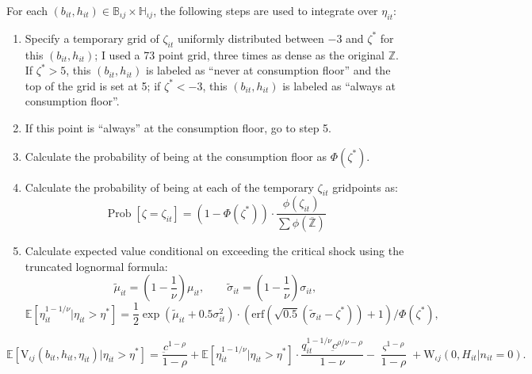 \documentclass[12pt,pdftex,letterpaper]{article}
\newcommand{\Prob}{\operatorname{Prob}}
\newcommand{\erf}{\text{erf}}
\newcommand{\E}{\mathbb{E}}
\newcommand{\Type}{\iota}
\newcommand{\Health}{h}
\newcommand{\PostHealth}{H}
\newcommand{\Value}{\text{V}}
\newcommand{\PostValue}{\text{W}}
\newcommand{\Con}{c}
\newcommand{\Invst}{n}
\newcommand{\Bank}{b}
\newcommand{\Copay}{q}
\newcommand{\ConFloor}{\underbar{\Con}}
\newcommand{\LifeUtility}{\varsigma}
\newcommand{\CRRAcon}{\rho}
\newcommand{\CRRAcare}{\nu}
\newcommand{\Age}{j}
\newcommand{\MedShk}{\eta}
\begin{document}
For each $(\Bank_{it},\Health_{it}) \in \mathbb{B}_{\Type \Age} \times \mathbb{H}_{\Type \Age}$, the following steps are used to integrate over $\MedShk_{it}$:
\begin{enumerate}
\item Specify a temporary grid of $\zeta_{it}$ uniformly distributed between $-3$ and $\zeta^*$ for this $(\Bank_{it},\Health_{it})$; I used a 73 point grid, three times as dense as the original $\mathbb{Z}$.  If $\zeta^* > 5$, this $(\Bank_{it},\Health_{it})$ is labeled as ``never at consumption floor'' and the top of the grid is set at 5; if $\zeta^* < -3$, this $(\Bank_{it},\Health_{it})$ is labeled as ``always at consumption floor''.

\item If this point is ``always'' at the consumption floor, go to step 5.

\item Calculate the probability of being at the consumption floor as $\Phi(\zeta^*)$.

\item Calculate the probability of being at each of the temporary $\zeta_{it}$ gridpoints as:
\begin{equation}
\Prob[\zeta = \zeta_{it}] = (1 - \Phi(\zeta^*)) \cdot \frac{\phi(\zeta_{it})} {\sum \phi(\overline{\mathbb{Z}})}
\end{equation}

\item Calculate expected value conditional on exceeding the critical shock using the truncated lognormal formula:
\begin{equation*}
\tilde{\mu}_{it}  = \left(1 - \frac{1}{\CRRAcare}\right) \mu_{it}, \qquad \tilde{\sigma}_{it} = \left(1 - \frac{1}{\CRRAcare}\right) \sigma_{it},
\end{equation*}
\begin{equation}
\E [\MedShk_{it}^{1-1/\CRRAcare} | \MedShk_{it} > \MedShk^*] = \frac{1}{2} \exp(\tilde{\mu}_{it}+0.5 \sigma_{it}^2) \cdot \left( \erf \left( \sqrt{0.5}(\tilde{\sigma}_{it}-\zeta^*) \right) + 1 \right) / \Phi(\zeta^*),
\end{equation}
\end{enumerate}
\begin{equation*}
\E [\Value_{\Type \Age}(\Bank_{it},\Health_{it},\MedShk_{it}) | \MedShk_{it} > \MedShk^* ] = \frac{\ConFloor^{1-\CRRAcon}}{1-\CRRAcon} + \E [\MedShk_{it}^{1-1/\CRRAcare} | \MedShk_{it} > \MedShk^*] \cdot \frac{\Copay_{it}^{1- 1/\CRRAcare} \ConFloor^{\CRRAcon/\CRRAcare - \CRRAcon}}{1 - \CRRAcare} - \frac{\LifeUtility^{1-\CRRAcon}}{1-\CRRAcon} + \PostValue_{\Type \Age}(0,\PostHealth_{it} | \Invst_{it}=0).
\end{equation*}
\end{document}

